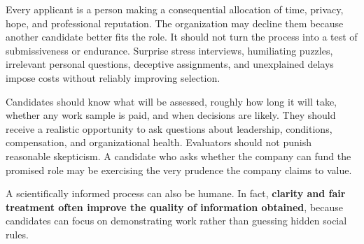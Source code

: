 Every applicant is a person making a consequential allocation of time, privacy, hope, and professional reputation. The organization may decline them because another candidate better fits the role. It should not turn the process into a test of submissiveness or endurance. Surprise stress interviews, humiliating puzzles, irrelevant personal questions, deceptive assignments, and unexplained delays impose costs without reliably improving selection.

Candidates should know what will be assessed, roughly how long it will take, whether any work sample is paid, and when decisions are likely. They should receive a realistic opportunity to ask questions about leadership, conditions, compensation, and organizational health. Evaluators should not punish reasonable skepticism. A candidate who asks whether the company can fund the promised role may be exercising the very prudence the company claims to value.

A scientifically informed process can also be humane. In fact, \textbf{clarity and fair treatment often improve the quality of information obtained}, because candidates can focus on demonstrating work rather than guessing hidden social rules.
